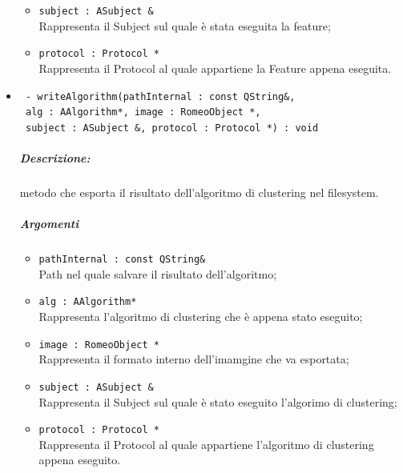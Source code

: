 \begin{itemize}
\begin{itemize}
					\item \color{RoyalPurple}\verb!subject : ASubject &!\\
					\color{black}Rappresenta il Subject\g{} sul quale è stata eseguita la feature\g{};
					
					\item \color{RoyalPurple}\verb!protocol : Protocol *!\\
					\color{black}Rappresenta il Protocol\g{} al quale appartiene la Feature\g{} appena eseguita.
				\end{itemize}
				
		
	\item \color{blue}\verb! - writeAlgorithm(pathInternal : const QString&,!\\
	 						    \verb! alg : AAlgorithm*, image : RomeoObject *,!\\
									\verb! subject : ASubject &, protocol : Protocol *) : void!\\
				\color{black}\subparagraph{Descrizione:} metodo che esporta il risultato dell'algoritmo di clustering\g{} nel filesystem.
				\subparagraph{Argomenti}
					\begin{itemize}
						\item \color{RoyalPurple}\verb!pathInternal : const QString&!\\
						\color{black}Path nel quale salvare il risultato dell'algoritmo\g{};
						
						\item \color{RoyalPurple}\verb!alg : AAlgorithm*!\\
						\color{black}Rappresenta l'algoritmo di clustering\g{} che è appena stato eseguito;
						
						\item \color{RoyalPurple}\verb!image : RomeoObject *!\\
						\color{black}Rappresenta il formato interno dell'imamgine che va esportata;
						
						\item \color{RoyalPurple}\verb!subject : ASubject &!\\
						\color{black}Rappresenta il Subject\g{} sul quale è stato eseguito l'algorimo di clustering\g{};
						
						\item \color{RoyalPurple}\verb!protocol : Protocol *!\\
						\color{black}Rappresenta il Protocol\g{} al quale appartiene l'algoritmo di clustering\g{} appena eseguito.
					\end{itemize}
	

\end{itemize}
